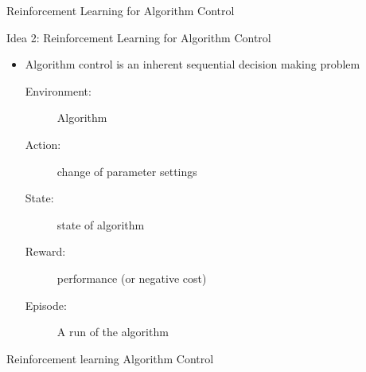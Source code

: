 \begin{frame}[c]{Reinforcement Learning for Algorithm Control}


\begin{block}{Idea 2: Reinforcement Learning for Algorithm Control}
\begin{itemize}
  \item Algorithm control is an inherent sequential decision making problem
  \begin{description}
  	\item[Environment:] Algorithm
  	\item[Action:] change of parameter settings
  	\item[State:] state of algorithm
  	\item[Reward:] performance (or negative cost)
  	\item[Episode:] A run of the algorithm
  \end{description}
\end{itemize}

\pause

\medskip
\centering
\scalebox{0.8}{
}

Reinforcement learning \hspace{1.4cm} Algorithm Control 

\end{block}

\end{frame}
